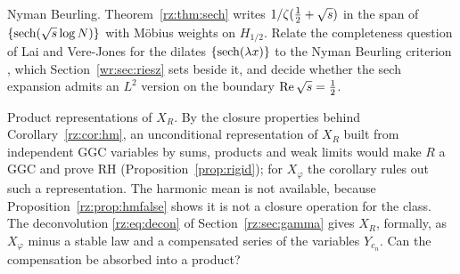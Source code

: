 \begin{problem}\label{rz:prob:nymanbeurling}
Nyman Beurling. Theorem~\ref{rz:thm:sech} writes $1/\zeta(\frac12+\sqrt{s})$ in the span of $\{\operatorname{sech}(\sqrt{s}\log N)\}$ with M\"obius weights on $H_{1/2}$. Relate the completeness question of Lai and Vere-Jones for the dilates $\{\operatorname{sech}(\lambda x)\}$ to the Nyman Beurling criterion \cite{Nyman50,Beurling55}, which Section~\ref{wr:sec:riesz} sets beside it, and decide whether the sech expansion admits an $L^2$ version on the boundary $\operatorname{Re}\sqrt{s}=\frac12$.
\end{problem}

\begin{problem}\label{rz:prob:xrproduct}
Product representations of $X_R$. By the closure properties behind Corollary~\ref{rz:cor:hm}, an unconditional representation of $X_R$ built from independent GGC variables by sums, products and weak limits would make $R$ a GGC and prove RH (Proposition~\ref{prop:rigid}); for $X_\varphi$ the corollary rules out such a representation. The harmonic mean is not available, because Proposition~\ref{rz:prop:hmfalse} shows it is not a closure operation for the class. The deconvolution \eqref{rz:eq:decon} of Section~\ref{rz:sec:gamma} gives $X_R$, formally, as $X_\varphi$ minus a stable law and a compensated series of the variables $Y_{c_n}$. Can the compensation be absorbed into a product?
\end{problem}
